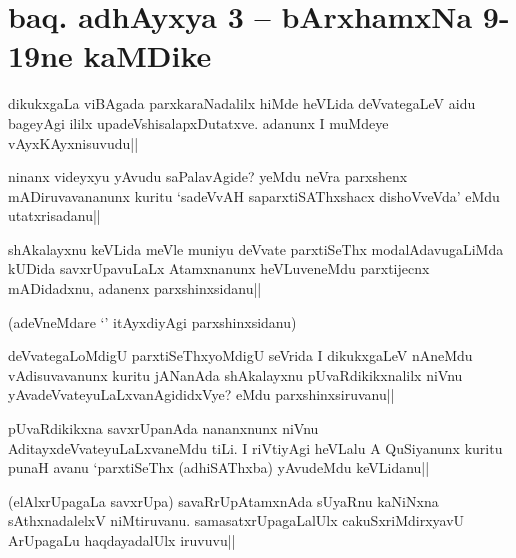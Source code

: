 \section*{baq. adhAyxya 3 -- bArxhamxNa 9-19ne kaMDike}


\begin{artha}
dikukxgaLa viBAgada parxkaraNadalilx hiMde heVLida deVvategaLeV aidu bageyAgi ililx upadeVshisalapxDutatxve. adanunx I muMdeye vAyxKAyxnisuvudu||
\end{artha}

\begin{artha}
ninanx videyxyu yAvudu saPalavAgide? yeMdu neVra parxshenx mADiruvavananunx kuritu `sadeVvAH saparxtiSAThxshacx dishoVveVda' eMdu utatxrisadanu||
\end{artha}


\begin{artha}
shAkalayxnu keVLida meVle muniyu deVvate parxtiSeThx modalAdavugaLiMda kUDida savxrUpavuLaLx Atamxnanunx heVLuveneMdu parxtijecnx mADidadxnu, adanenx parxshinxsidanu||

(adeVneMdare `\stext ' itAyxdiyAgi parxshinxsidanu)
\end{artha}


\begin{artha}
deVvategaLoMdigU parxtiSeThxyoMdigU seVrida I dikukxgaLeV nAneMdu vAdisuvavanunx kuritu jANanAda shAkalayxnu pUvaRdikikxnalilx niVnu yAvadeVvateyuLaLxvanAgididxVye? eMdu parxshinxsiruvanu||
\end{artha}


\begin{artha}
pUvaRdikikxna savxrUpanAda nananxnunx niVnu AditayxdeVvateyuLaLxvaneMdu tiLi. I riVtiyAgi heVLalu A QuSiyanunx kuritu punaH avanu `parxtiSeThx (adhiSAThxba) yAvudeMdu keVLidanu||
\end{artha}

\begin{artha}
(elAlxrUpagaLa savxrUpa) savaRrUpAtamxnAda sUyaRnu kaNiNxna sAthxnadalelxV niMtiruvanu. samasatxrUpagaLalUlx cakuSxriMdirxyavU ArUpagaLu haqdayadalUlx iruvuvu||
\end{artha}

